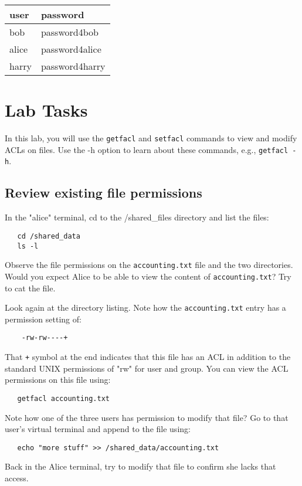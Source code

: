 \medskip
{\begin{tabular}{ l | l  }

 \hline
 user & password \\ \hline
 bob & password4bob \\
 alice & password4alice \\
 harry & password4harry \\
\end{tabular}

\section{Lab Tasks}
In this lab, you will use the {\tt getfacl} and {\tt setfacl} commands to 
view and modify ACLs on files. Use the -h option to learn about these
commands, e.g., {\tt getfacl -h}.

\subsection{Review existing file permissions}
In the "alice" terminal, cd to the /shared\_files directory and list
the files:
\begin{verbatim}
   cd /shared_data
   ls -l
\end{verbatim}
\noindent
Observe the file permissions on the {\tt accounting.txt} file and the two
directories.  Would you expect Alice to be able to view the content of
{\tt accounting.txt}?  Try to cat the file.

Look again at the directory listing.  Note how the {\tt accounting.txt}
entry has a permission setting of:
\begin{verbatim}
    -rw-rw----+
\end{verbatim}
That {\tt +} symbol at the end indicates that this file has an ACL in addition
to the standard UNIX permissions of "rw" for user and group.  You can view the
ACL permissions on this file using:
\begin{verbatim}
   getfacl accounting.txt
\end{verbatim}

Note how one of the three users has permission to modify that file?  Go to that
user's virtual terminal and append to the file using:
\begin{verbatim}
   echo "more stuff" >> /shared_data/accounting.txt
\end{verbatim}

Back in the Alice terminal, try to modify that file to confirm she lacks that access.


}
